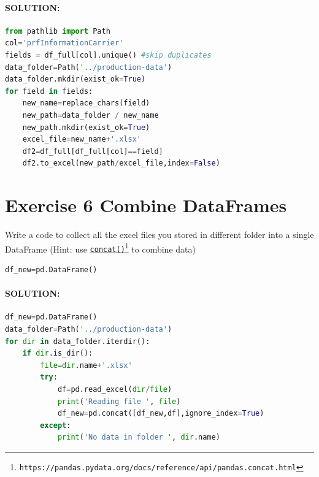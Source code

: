\documentclass[%
twoside,                 %
final,                   %
10pt]{article}
\begin{document}
\paragraph{SOLUTION:}














\begin{lstlisting}[language=Python,style=blue1bar]
from pathlib import Path
col='prfInformationCarrier'
fields = df_full[col].unique() #skip duplicates
data_folder=Path('../production-data')
data_folder.mkdir(exist_ok=True)
for field in fields:
    new_name=replace_chars(field)
    new_path=data_folder / new_name
    new_path.mkdir(exist_ok=True)
    excel_file=new_name+'.xlsx'
    df2=df_full[df_full[col]==field]
    df2.to_excel(new_path/excel_file,index=False)

\end{lstlisting}


\section{Exercise 6 Combine DataFrames}
Write a code to collect all the excel files you stored in different folder into a single DataFrame (Hint: use \href{{https://pandas.pydata.org/docs/reference/api/pandas.concat.html}}{\nolinkurl{concat()}\footnote{\texttt{https://pandas.pydata.org/docs/reference/api/pandas.concat.html}}} to combine data)



\begin{lstlisting}[language=Python,style=blue1bar]
df_new=pd.DataFrame()

\end{lstlisting}


\paragraph{SOLUTION:}













\begin{lstlisting}[language=Python,style=blue1bar]
df_new=pd.DataFrame()
data_folder=Path('../production-data')
for dir in data_folder.iterdir():
    if dir.is_dir():      
        file=dir.name+'.xlsx'
        try:
            df=pd.read_excel(dir/file)
            print('Reading file ', file)
            df_new=pd.concat([df_new,df],ignore_index=True)
        except:
            print('No data in folder ', dir.name)

\end{lstlisting}
\end{document}
